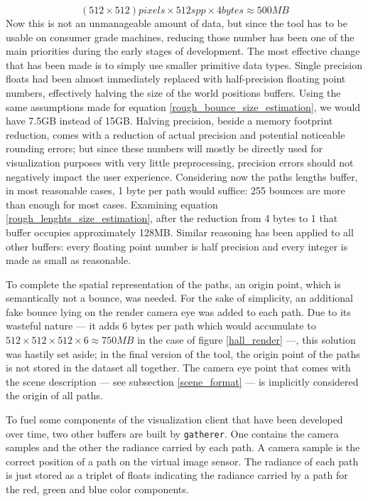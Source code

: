 \begin{equation}
	\label{rough_lenghts_size_estimation}
	(512 \times 512) pixels \times 512 spp \times 4 bytes \approx 500MB
\end{equation}
Now this is not an unmanageable amount of data, but since the tool has to be usable on consumer grade machines, reducing those number has been one of the main priorities during the early stages of development. The most effective change that has been made is to simply use smaller primitive data types. 
Single precision floats had been almost immediately replaced with half-precision floating point numbers, effectively halving the size of the world positions buffers. Using the same assumptions made for equation \ref{rough_bounce_size_estimation}, we would have 7.5GB instead of 15GB.
Halving precision, beside a memory footprint reduction, comes with a reduction of actual precision and potential noticeable rounding errors; but since these numbers will mostly be directly used for visualization purposes with very little preprocessing, precision errors should not negatively impact the user experience.
Considering now the paths lengths buffer, in most reasonable cases, 1 byte per path would suffice: 255 bounces are more than enough for most cases. Examining equation \ref{rough_lenghts_size_estimation}, after the reduction from 4 bytes to 1 that buffer occupies approximately 128MB. Similar reasoning has been applied to all other buffers: every floating point number is half precision and every integer is made as small as reasonable.

To complete the spatial representation of the paths, an origin point, which is semantically not a bounce, was needed. For the sake of simplicity, an additional fake bounce lying on the render camera eye was added to each path. Due to its wasteful nature --- it adds 6 bytes per path which would accumulate to $512\times 512\times 512\times 6\approx 750MB$ in the case of figure \ref{hall_render} ---, this solution was hastily set aside; in the final version of the tool, the origin point of the paths is not stored in the dataset all together. The camera eye point that comes with the scene description --- see subsection \ref{scene_format} --- is implicitly considered the origin of all paths.

To fuel some components of the visualization client that have been developed over time, two other buffers are built by \texttt{gatherer}. One contains the camera samples and the other the radiance carried by each path. A camera sample is the correct position of a path on the virtual image sensor. The radiance of each path is just stored as a triplet of floats indicating the radiance carried by a path for the red, green and blue color components.

